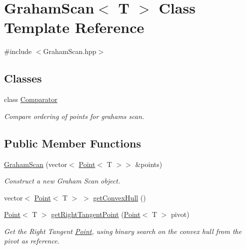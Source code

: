 \hypertarget{classGrahamScan}{}\section{Graham\+Scan$<$ T $>$ Class Template Reference}
\label{classGrahamScan}


{\ttfamily \#include $<$Graham\+Scan.\+hpp$>$}

\subsection*{Classes}
\begin{DoxyCompactItemize}
\item 
class \mbox{\hyperlink{classGrahamScan_1_1Comparator}{Comparator}}
\begin{DoxyCompactList}\small\item\em Compare ordering of points for graham\textquotesingle{}s scan. \end{DoxyCompactList}\end{DoxyCompactItemize}
\subsection*{Public Member Functions}
\begin{DoxyCompactItemize}
\item 
\mbox{\hyperlink{classGrahamScan_af518504ce673b75e7bef7a0de90e7699}{Graham\+Scan}} (vector$<$ \mbox{\hyperlink{classPoint}{Point}}$<$ T $>$$>$ \&points)
\begin{DoxyCompactList}\small\item\em Construct a new Graham Scan object. \end{DoxyCompactList}\item 
vector$<$ \mbox{\hyperlink{classPoint}{Point}}$<$ T $>$ $>$ \mbox{\hyperlink{classGrahamScan_a0731f364efdbbb6028a38c623e99766d}{get\+Convex\+Hull}} ()
\item 
\mbox{\hyperlink{classPoint}{Point}}$<$ T $>$ \mbox{\hyperlink{classGrahamScan_af47ec86625b2f4f32752c92ef29fbcbd}{get\+Right\+Tangent\+Point}} (\mbox{\hyperlink{classPoint}{Point}}$<$ T $>$ pivot)
\begin{DoxyCompactList}\small\item\em Get the Right Tangent \mbox{\hyperlink{classPoint}{Point}}, using binary search on the convex hull from the pivot as reference. \end{DoxyCompactList}\end{DoxyCompactItemize}
